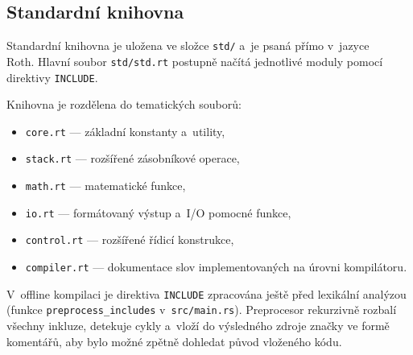\subsection{Standardní knihovna}
\label{sec:stdlib}

Standardní knihovna je uložena ve složce \texttt{std/} a~je psaná přímo
v~jazyce \\Roth{}. Hlavní soubor \texttt{std/std.rt} postupně načítá jednotlivé
moduly pomocí direktivy \texttt{INCLUDE}.

Knihovna je rozdělena do tematických souborů:
\begin{itemize}
	\item \texttt{core.rt} --- základní konstanty a~utility,
	\item \texttt{stack.rt} --- rozšířené zásobníkové operace,
	\item \texttt{math.rt} --- matematické funkce,
	\item \texttt{io.rt} --- formátovaný výstup a~I/O pomocné funkce,
	\item \texttt{control.rt} --- rozšířené řídicí konstrukce,
	\item \texttt{compiler.rt} --- dokumentace slov implementovaných na úrovni kompilátoru.
\end{itemize}

V~offline kompilaci je direktiva \texttt{INCLUDE} zpracována ještě před lexikální
analýzou (funkce \texttt{preprocess\_includes} v~\texttt{src/main.rs}). Preprocesor
rekurzivně rozbalí všechny inkluze, detekuje cykly a~vloží do výsledného zdroje
značky ve formě komentářů, aby bylo možné zpětně dohledat původ vloženého kódu.
